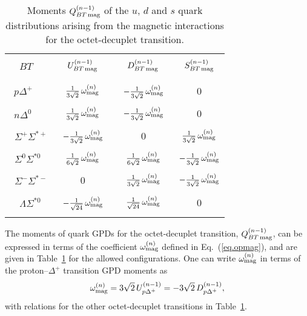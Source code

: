 \documentclass[preprintnumbers,prd,superscriptaddress,preprint]{revtex4-1}
\begin{document}
\begin{table}[b]
\begin{center}
\caption{Moments $Q^{(n-1)}_{BT\,\rm mag}$ of the $u$, $d$ and $s$ quark distributions arising from the magnetic interactions for the octet-decuplet transition.\\}
\begin{tabular}{l|c|c|c} \hline
& & &
\\
~~$BT$ &
$U^{(n-1)}_{BT\,\rm mag}$ & 
$D^{(n-1)}_{BT\,\rm mag}$ & 
$S^{(n-1)}_{BT\,\rm mag}$ 
\\ 
& & &
\\ \hline
& & &
\\
$~~p\Delta^{+}$ & 
$\frac{1}{3\sqrt2}\, \omega_{\rm mag}^{(n)}$ &
~$-\frac{1}{3\sqrt2}\, \omega_{\rm mag}^{(n)}$~ &
$0$ 
\\
& & &
\\
$~~n\Delta^0$ &
$\frac{1}{3\sqrt2}\, \omega_{\rm mag}^{(n)}$ &
$-\frac{1}{3\sqrt2}\, \omega_{\rm mag}^{(n)}$ &
$0$
\\
& & &
\\
~$\Sigma^+\Sigma^{*+}$ &
~$-\frac{1}{3\sqrt2}\, \omega_{\rm mag}^{(n)}$~ &
$0$ &
$\frac{1}{3\sqrt2}\, \omega_{\rm mag}^{(n)}$
\\
& & &
\\
~$\Sigma^0\Sigma^{*0}$ & 
$\frac{1}{6\sqrt2}\, \omega_{\rm mag}^{(n)}$ & 
$\frac{1}{6\sqrt2}\, \omega_{\rm mag}^{(n)}$ &
$-\frac{1}{3\sqrt2}\, \omega_{\rm mag}^{(n)}$
\\
& & &
\\
~$\Sigma^-\Sigma^{*-}$ &
$0$ &
$\frac{1}{3\sqrt2}\, \omega_{\rm mag}^{(n)}$ &
$-\frac{1}{3\sqrt2}\, \omega_{\rm mag}^{(n)}$
\\
& & &
\\
~~$\Lambda\Sigma^{*0}$ & 
~$-\frac{1}{\sqrt{24}}\, \omega_{\rm mag}^{(n)}$~ &
$\frac{1}{\sqrt{24}}\, \omega_{\rm mag}^{(n)}$ & 
$0$
\\
& & &
\\ \hline
\end{tabular}
\label{tab:BT}
\end{center}
\end{table}


The moments of quark GPDs for the octet-decuplet transition, $Q_{BT\,\rm mag}^{(n-1)}$, can be expressed in terms of the coefficient $\omega_{\rm mag}^{(n)}$ defined in Eq.~(\ref{eq.opmag}), and are given in Table~\ref{tab:BT} for the allowed configurations.
One can write $\omega_{\rm mag}^{(n)}$ in terms of the proton--$\Delta^+$ transition GPD moments as
%
\begin{equation}
\omega_{\rm mag}^{(n)}
= 3\sqrt2\, U_{p\Delta^+}^{(n-1)} = -3\sqrt2\, D_{p\Delta^+}^{(n-1)},
\end{equation}
%
with relations for the other octet-decuplet transitions in Table~\ref{tab:BT}.
\end{document}
